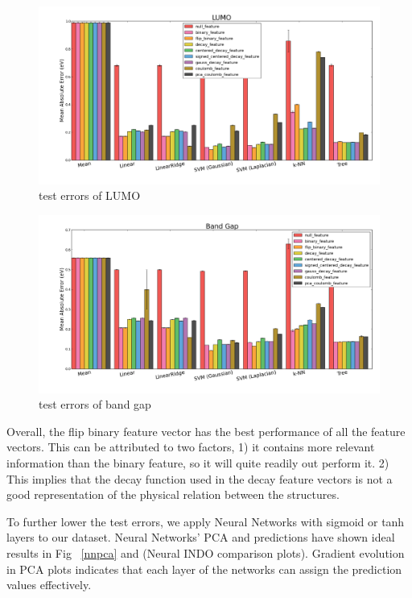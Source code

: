 \begin{figure}[H]
\begin{center}
\includegraphics [width=1\textwidth]{lumo_results.png}
\caption{test errors of LUMO}\label{lumo}
\end{center}
\end{figure}

\begin{figure}[H]
\begin{center}
\includegraphics [width=1\textwidth]{gap_results.png}
\caption{test errors of band gap}\label{gap}
\end{center}
\end{figure}
Overall, the flip binary feature vector has the best performance of all the feature vectors. This can be attributed to two factors, 1) it contains more relevant information than the binary feature, so it will quite readily out perform it. 2) This implies that the decay function used in the decay feature vectors is not a good representation of the physical relation between the structures.

To further lower the test errors, we apply Neural Networks with sigmoid or tanh layers to our dataset. Neural Networks' PCA and predictions have shown ideal results in Fig ~\ref{nnpca} and  (Neural INDO comparison plots). Gradient evolution in PCA plots indicates that each layer of the networks can assign the prediction values effectively. 

